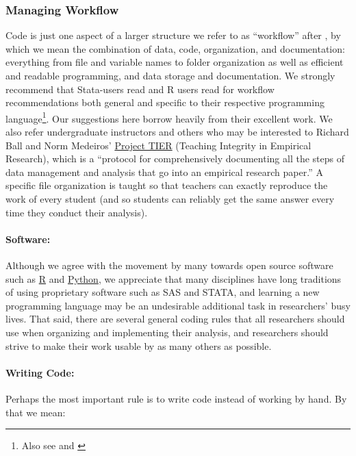 \documentclass[12pt] {article}
\begin{document}
\subsubsection{Managing Workflow}\label{managing-workflow}

Code is just one aspect of a larger structure we refer to as
``workflow'' after \cite{long_workflow_2008}, by which we mean the
combination of data, code, organization, and documentation: everything
from file and variable names to folder organization as well as efficient
and readable programming, and data storage and documentation. We strongly recommend that Stata-users read \cite{long_workflow_2008} and R users read \cite{gandrud2013reproducible} for workflow recommendations both general and specific to their respective programming language\footnote{Also see and \cite{kirchkamp_workflow_????}}. Our suggestions here borrow heavily from their excellent work. We also refer undergraduate instructors and others who may be interested to Richard Ball and Norm Medeiros' \href{http://www.haverford.edu/TIER/}{Project TIER} (Teaching Integrity in Empirical Research), which is a ``protocol for comprehensively documenting all the steps of data management and analysis that go into an empirical research paper.'' A specific file organization is taught so that teachers can exactly reproduce the work of every student (and so students can reliably get the same answer every time they conduct their analysis). 

\paragraph{Software:}

Although we agree with the movement by many towards open source software such
as \href{http://www.r-project.org/}{R} and \href{https://www.python.org/}{Python}, we appreciate that many disciplines have long
traditions of using proprietary software such as SAS and STATA, and
learning a new programming language may be an undesirable additional
task in researchers' busy lives. That said, there are several general
coding rules that all researchers should use when organizing and
implementing their analysis, and researchers should strive to make their
work usable by as many others as possible.

\paragraph{Writing Code:}
Perhaps the most important rule is to write code instead of working by hand. By
that we mean:
\end{document}
